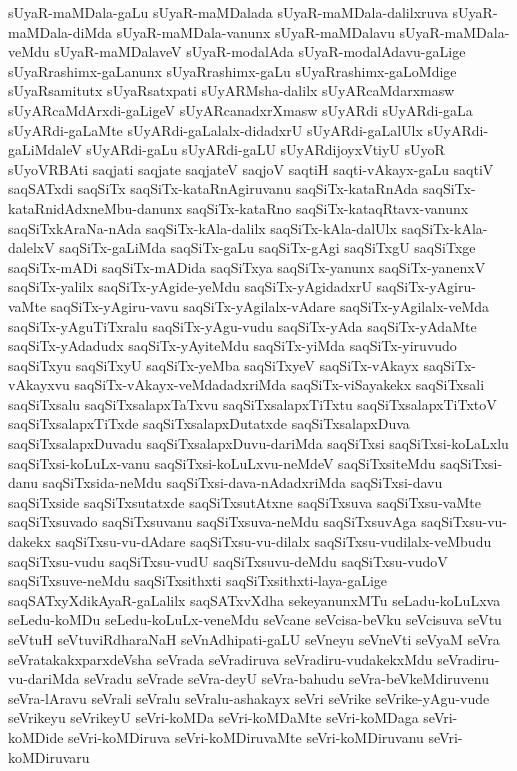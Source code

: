 {sUyaR-maMDala-gaLu
sUyaR-maMDalada
sUyaR-maMDala-dalilxruva
sUyaR-maMDala-diMda
sUyaR-maMDala-vanunx
sUyaR-maMDalavu
sUyaR-maMDala-veMdu
sUyaR-maMDalaveV
sUyaR-modalAda
sUyaR-modalAdavu-gaLige
sUyaRrashimx-gaLanunx
sUyaRrashimx-gaLu
sUyaRrashimx-gaLoMdige
sUyaRsamitutx
sUyaRsatxpati
sUyARMsha-dalilx
sUyARcaMdarxmasw
sUyARcaMdArxdi-gaLigeV
sUyARcanadxrXmasw
sUyARdi
sUyARdi-gaLa
sUyARdi-gaLaMte
sUyARdi-gaLalalx-didadxrU
sUyARdi-gaLalUlx
sUyARdi-gaLiMdaleV
sUyARdi-gaLu
sUyARdi-gaLU
sUyARdijoyxVtiyU
sUyoR
sUyoVRBAti
saqjati
saqjate
saqjateV
saqjoV
saqtiH
saqti-vAkayx-gaLu
saqtiV
saqSATxdi
saqSiTx
saqSiTx-kataRnAgiruvanu
saqSiTx-kataRnAda
saqSiTx-kataRnidAdxneMbu-danunx
saqSiTx-kataRno
saqSiTx-kataqRtavx-vanunx
saqSiTxkAraNa-nAda
saqSiTx-kAla-dalilx
saqSiTx-kAla-dalUlx
saqSiTx-kAla-dalelxV
saqSiTx-gaLiMda
saqSiTx-gaLu
saqSiTx-gAgi
saqSiTxgU
saqSiTxge
saqSiTx-mADi
saqSiTx-mADida
saqSiTxya
saqSiTx-yanunx
saqSiTx-yanenxV
saqSiTx-yalilx
saqSiTx-yAgide-yeMdu
saqSiTx-yAgidadxrU
saqSiTx-yAgiru-vaMte
saqSiTx-yAgiru-vavu
saqSiTx-yAgilalx-vAdare
saqSiTx-yAgilalx-veMda
saqSiTx-yAguTiTxralu
saqSiTx-yAgu-vudu
saqSiTx-yAda
saqSiTx-yAdaMte
saqSiTx-yAdadudx
saqSiTx-yAyiteMdu
saqSiTx-yiMda
saqSiTx-yiruvudo
saqSiTxyu
saqSiTxyU
saqSiTx-yeMba
saqSiTxyeV
saqSiTx-vAkayx
saqSiTx-vAkayxvu
saqSiTx-vAkayx-veMdadadxriMda
saqSiTx-viSayakekx
saqSiTxsali
saqSiTxsalu
saqSiTxsalapxTaTxvu
saqSiTxsalapxTiTxtu
saqSiTxsalapxTiTxtoV
saqSiTxsalapxTiTxde
saqSiTxsalapxDutatxde
saqSiTxsalapxDuva
saqSiTxsalapxDuvadu
saqSiTxsalapxDuvu-dariMda
saqSiTxsi
saqSiTxsi-koLaLxlu
saqSiTxsi-koLuLx-vanu
saqSiTxsi-koLuLxvu-neMdeV
saqSiTxsiteMdu
saqSiTxsi-danu
saqSiTxsida-neMdu
saqSiTxsi-dava-nAdadxriMda
saqSiTxsi-davu
saqSiTxside
saqSiTxsutatxde
saqSiTxsutAtxne
saqSiTxsuva
saqSiTxsu-vaMte
saqSiTxsuvado
saqSiTxsuvanu
saqSiTxsuva-neMdu
saqSiTxsuvAga
saqSiTxsu-vu-dakekx
saqSiTxsu-vu-dAdare
saqSiTxsu-vu-dilalx
saqSiTxsu-vudilalx-veMbudu
saqSiTxsu-vudu
saqSiTxsu-vudU
saqSiTxsuvu-deMdu
saqSiTxsu-vudoV
saqSiTxsuve-neMdu
saqSiTxsithxti
saqSiTxsithxti-laya-gaLige
saqSATxyXdikAyaR-gaLalilx
saqSATxvXdha
sekeyanunxMTu
seLadu-koLuLxva
seLedu-koMDu
seLedu-koLuLx-veneMdu
seVcane
seVcisa-beVku
seVcisuva
seVtu
seVtuH
seVtuviRdharaNaH
seVnAdhipati-gaLU
seVneyu
seVneVti
seVyaM
seVra
seVratakakxparxdeVsha
seVrada
seVradiruva
seVradiru-vudakekxMdu
seVradiru-vu-dariMda
seVradu
seVrade
seVra-deyU
seVra-bahudu
seVra-beVkeMdiruvenu
seVra-lAravu
seVrali
seVralu
seVralu-ashakayx
seVri
seVrike
seVrike-yAgu-vude
seVrikeyu
seVrikeyU
seVri-koMDa
seVri-koMDaMte
seVri-koMDaga
seVri-koMDide
seVri-koMDiruva
seVri-koMDiruvaMte
seVri-koMDiruvanu
seVri-koMDiruvaru
}
